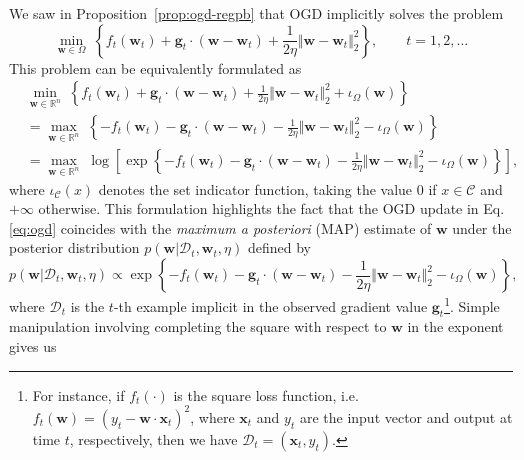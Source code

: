 We saw in Proposition~\ref{prop:ogd-regpb} that OGD implicitly solves the problem
\begin{equation}
\label{eq:ogd-criterion}
	\min_{\mathbf{w} \in \Omega} \; \left\{f_t(\mathbf{w}_t) + \mathbf{g}_t \cdot (\mathbf{w} - \mathbf{w}_t) + \frac{1}{2\eta}\Vert\mathbf{w} - \mathbf{w}_t\Vert_2^2\right\},
	\qquad t = 1, 2, \ldots
\end{equation}
This problem can be equivalently formulated as
\begin{align}
\label{eq:ogd-optpb-proba-form}
	& \min_{\mathbf{w} \in \mathbb{R}^n} \; \left\{f_t(\mathbf{w}_t) + \mathbf{g}_t \cdot (\mathbf{w} - \mathbf{w}_t) + \frac{1}{2\eta}\Vert\mathbf{w} - \mathbf{w}_t\Vert_2^2 + \iota_{\Omega}(\mathbf{w})\right\}
	\nonumber \\
	&= \max_{\mathbf{w} \in \mathbb{R}^n} \; \left\{-f_t(\mathbf{w}_t) - \mathbf{g}_t \cdot (\mathbf{w} - \mathbf{w}_t) - \frac{1}{2\eta}\Vert\mathbf{w} - \mathbf{w}_t\Vert_2^2 - \iota_{\Omega}(\mathbf{w})\right\}
	\nonumber \\
	&= \max_{\mathbf{w} \in \mathbb{R}^n} \; \log\left[\exp\left\{-f_t(\mathbf{w}_t) - \mathbf{g}_t \cdot (\mathbf{w} - \mathbf{w}_t) - \frac{1}{2\eta}\Vert\mathbf{w} - \mathbf{w}_t\Vert_2^2 - \iota_{\Omega}(\mathbf{w})\right\}\right],
\end{align}
where $\iota_{\mathcal{C}}(x)$ denotes the set indicator function, taking the value $0$ if $x \in \mathcal{C}$ and $+\infty$ otherwise.
This formulation highlights the fact that the OGD update in Eq. \eqref{eq:ogd} coincides with the \emph{maximum a posteriori} (MAP) estimate of $\mathbf{w}$ under the posterior distribution $p(\mathbf{w}|\mathcal{D}_t, \mathbf{w}_t, \eta)$ defined by
\begin{equation}
\label{eq:ogd-unnormalised-posterior}
	p(\mathbf{w}|\mathcal{D}_t, \mathbf{w}_t, \eta)
	\propto \exp\left\{-f_t(\mathbf{w}_t) - \mathbf{g}_t \cdot (\mathbf{w} - \mathbf{w}_t) - \frac{1}{2\eta}\Vert\mathbf{w} - \mathbf{w}_t\Vert_2^2 - \iota_{\Omega}(\mathbf{w})\right\},
\end{equation}
where $\mathcal{D}_t$ is the $t$-th example implicit in the observed gradient value $\mathbf{g}_t$\footnote{For instance, if $f_t(\cdot)$ is the square loss function, i.e.\ $f_t(\mathbf{w}) = (y_t - \mathbf{w}\cdot\mathbf{x}_t)^2$, where $\mathbf{x}_t$ and $y_t$ are the input vector and output at time $t$, respectively, then we have $\mathcal{D}_t = (\mathbf{x}_t, y_t)$.}.
Simple manipulation involving completing the square with respect to $\mathbf{w}$ in the exponent gives us
